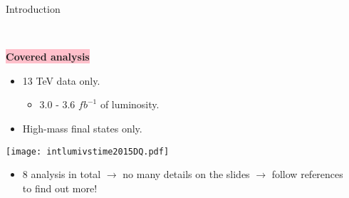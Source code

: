 \documentclass[8pt]{beamer}
\begin{document}
\begin{frame}{\large \large Introduction}
 
 
 
 \begin{columns}
  \begin{column}{6.5cm}
  \vspace{0.25cm} \\
  \noindent\colorbox{pink}{
	\textbf{Covered analysis}
    }\par
    \vspace{0.1cm}
    \begin{itemize}
     \item 13 TeV data only.
     \begin{itemize}
      \item 3.0 - 3.6 $fb^{-1}$ of luminosity.
     \end{itemize}
     \item High-mass final states only.
    \end{itemize}
  
    \texttt{[image: intlumivstime2015DQ.pdf]}\\
    
    \begin{itemize}
     \item 8 analysis in total $\to$ no many details on the slides $\to$ follow references to find out more!
    \end{itemize}

    
    \begin{tikzpicture}[overlay]


    \end{tikzpicture}
  
  \end{column}
  \begin{column}{6cm}
  

\end{column}
\end{columns}
\end{frame}
\end{document}
